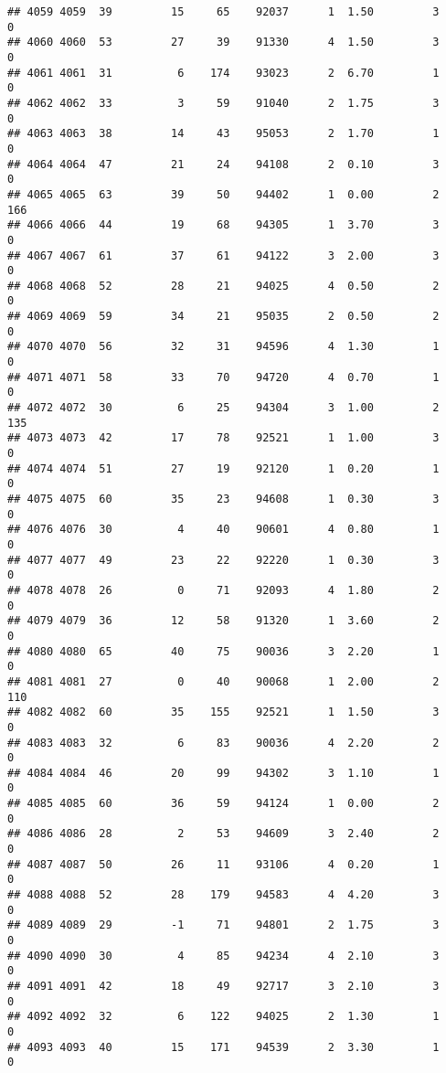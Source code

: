 \documentclass[
]{article}
\begin{document}
\begin{verbatim}
## 4059 4059  39         15     65    92037      1  1.50         3        0
## 4060 4060  53         27     39    91330      4  1.50         3        0
## 4061 4061  31          6    174    93023      2  6.70         1        0
## 4062 4062  33          3     59    91040      2  1.75         3        0
## 4063 4063  38         14     43    95053      2  1.70         1        0
## 4064 4064  47         21     24    94108      2  0.10         3        0
## 4065 4065  63         39     50    94402      1  0.00         2      166
## 4066 4066  44         19     68    94305      1  3.70         3        0
## 4067 4067  61         37     61    94122      3  2.00         3        0
## 4068 4068  52         28     21    94025      4  0.50         2        0
## 4069 4069  59         34     21    95035      2  0.50         2        0
## 4070 4070  56         32     31    94596      4  1.30         1        0
## 4071 4071  58         33     70    94720      4  0.70         1        0
## 4072 4072  30          6     25    94304      3  1.00         2      135
## 4073 4073  42         17     78    92521      1  1.00         3        0
## 4074 4074  51         27     19    92120      1  0.20         1        0
## 4075 4075  60         35     23    94608      1  0.30         3        0
## 4076 4076  30          4     40    90601      4  0.80         1        0
## 4077 4077  49         23     22    92220      1  0.30         3        0
## 4078 4078  26          0     71    92093      4  1.80         2        0
## 4079 4079  36         12     58    91320      1  3.60         2        0
## 4080 4080  65         40     75    90036      3  2.20         1        0
## 4081 4081  27          0     40    90068      1  2.00         2      110
## 4082 4082  60         35    155    92521      1  1.50         3        0
## 4083 4083  32          6     83    90036      4  2.20         2        0
## 4084 4084  46         20     99    94302      3  1.10         1        0
## 4085 4085  60         36     59    94124      1  0.00         2        0
## 4086 4086  28          2     53    94609      3  2.40         2        0
## 4087 4087  50         26     11    93106      4  0.20         1        0
## 4088 4088  52         28    179    94583      4  4.20         3        0
## 4089 4089  29         -1     71    94801      2  1.75         3        0
## 4090 4090  30          4     85    94234      4  2.10         3        0
## 4091 4091  42         18     49    92717      3  2.10         3        0
## 4092 4092  32          6    122    94025      2  1.30         1        0
## 4093 4093  40         15    171    94539      2  3.30         1        0

\end{verbatim}
\end{document}
